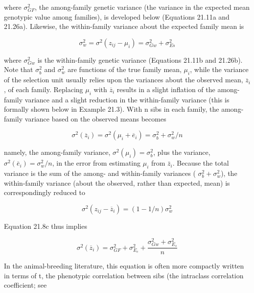 \documentclass{article}
\begin{document}
where  $ \sigma_{GF}^{2} $, the among-family genetic variance (the variance in the expected mean genotypic value among families), is developed below (Equations 21.11a and 21.26a). Likewise, the within-family variance about the expected family mean is

\begin{equation}
\sigma_{w}^{2}=\sigma^{2}(z_{ij}-\mu_{i})=\sigma_{Gw}^{2}+\sigma_{Es}^{2}
\tag{21.8b}
\label{eq:21_8b}
\end{equation}

where  $ \sigma_{Gw}^{2} $ is the within-family genetic variance (Equations 21.11b and 21.26b). Note that  $ \sigma_{b}^{2} $ and  $ \sigma_{w}^{2} $ are functions of the true family mean,  $ \mu_{i} $, while the variance of the selection unit usually relies upon the variances about the observed mean,  $ \overline{z}_{i} $, of each family. Replacing  $ \mu_{i} $ with  $ \overline{z}_{i} $ results in a slight inflation of the among-family variance and a slight reduction in the within-family variance (this is formally shown below in Example 21.3). With n sibs in each family, the among-family variance based on the observed means becomes

\begin{equation}
\sigma^{2}(\overline{z}_{i})=\sigma^{2}(\mu_{i}+\overline{e}_{i})=\sigma_{b}^{2}+\sigma_{w}^{2}/n
\tag{21.8c}
\label{eq:21_8c}
\end{equation}

namely, the among-family variance,  $ \sigma^2(\mu_i) = \sigma_b^2 $, plus the variance,  $ \sigma^2(\bar{e}_i) = \sigma_w^2/n $, in the error from estimating  $ \mu_i $ from  $ \bar{z}_i $. Because the total variance is the sum of the among- and within-family variances ( $ \sigma_b^2 + \sigma_w^2 $), the within-family variance (about the observed, rather than expected, mean) is correspondingly reduced to

\begin{equation}
\sigma^{2}(z_{i j}-\overline{{z}}_{i})=(1-1/n)\sigma_{w}^{2}
\tag{21.8d}
\label{eq:21_8d}
\end{equation}

Equation 21.8c thus implies

\begin{equation}
\sigma^{2}(\overline{z}_{i})=\sigma_{G F}^{2}+\sigma_{E_{c}}^{2}+\frac{\sigma_{G w}^{2}+\sigma_{E_{s}}^{2}}{n}
\tag{21.9a}
\label{eq:21_9a}
\end{equation}

In the animal-breeding literature, this equation is often more compactly written in terms of t, the phenotypic correlation between sibs (the intraclass correlation coefficient; see
\end{document}

